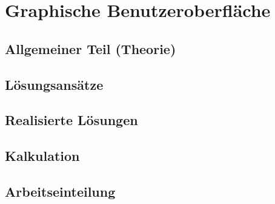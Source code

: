 

\chapter{Graphische Benutzeroberfläche}


\section{Allgemeiner Teil (Theorie)}


\section{Lösungsansätze}

\section{Realisierte Lösungen}

\section{Kalkulation}

\section{Arbeitseinteilung}